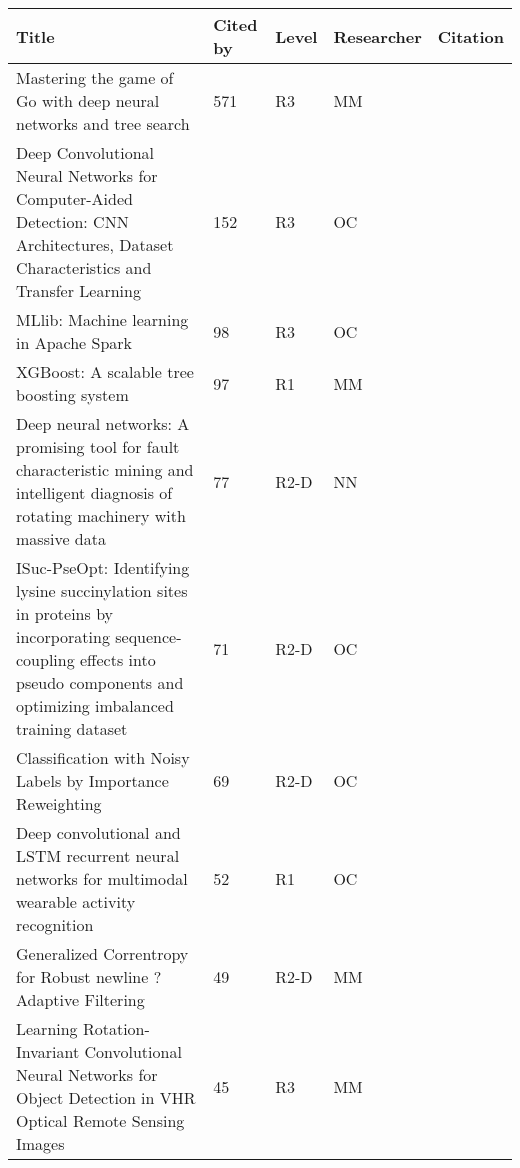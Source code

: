 \begin{tabularx}{\textwidth}{Xllll}
\toprule
                                                                                                                                                                        Title &  Cited by & Level & Researcher &                        Citation \\
\midrule
 Mastering the game of Go with deep neural networks and tree search &  571 &  R3 &  MM &  {\cite{silver2016mastering}} \\
 Deep Convolutional Neural Networks for Computer-Aided Detection: CNN Architectures, Dataset Characteristics and Transfer Learning &  152 &  R3 &  OC &  {\cite{shin2016deep}} \\
 MLlib: Machine learning in Apache Spark &  98 &  R3 &  OC &  {\cite{meng2016mllib}} \\
 XGBoost: A scalable tree boosting system &  97 &  R1 &  MM &  {\cite{chen2016xgboost}} \\
 Deep neural networks: A promising tool for fault characteristic mining and intelligent diagnosis of rotating machinery with massive data &  77 &  R2-D &  NN &  {\cite{jia2016deep}} \\
 ISuc-PseOpt: Identifying lysine succinylation sites in proteins by incorporating sequence-coupling effects into pseudo components and optimizing imbalanced training dataset &  71 &  R2-D &  OC &  {\cite{jia2016isucpseopt}} \\
 Classification with Noisy Labels by Importance Reweighting &  69 &  R2-D &  OC &  {\cite{liu2016classification}} \\
 Deep convolutional and LSTM recurrent neural networks for multimodal wearable activity recognition &  52 &  R1 &  OC &  {\cite{ordonez2016deep}} \\
 Generalized Correntropy for Robust newline ?Adaptive Filtering &  49 &  R2-D &  MM &  {\cite{chen2016generalized}} \\
 Learning Rotation-Invariant Convolutional Neural Networks for Object Detection in VHR Optical Remote Sensing Images &  45 &  R3 &  MM &  {\cite{cheng2016learning}} \\
\bottomrule
\end{tabularx}
